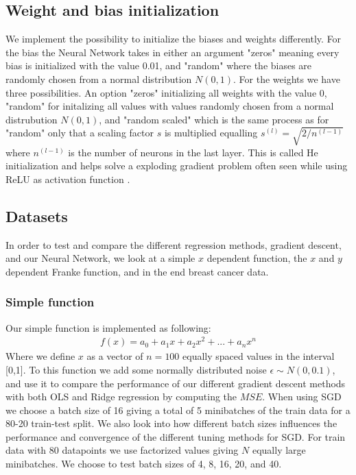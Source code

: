 \documentclass[11pt]{article}
\begin{document}
\subsection{Weight and bias initialization}
We implement the possibility to initialize the biases and weights differently. For the bias the Neural Network takes in either an argument "zeros" meaning every bias is initialized with the value 0.01, and "random" where the biases are randomly chosen from a normal distribution $N(0,1)$. For the weights we have three possibilities. An option "zeros" initializing all weights with the value 0, "random" for initalizing all values with values randomly chosen from a normal distrubution $N(0,1)$, and "random scaled" which is the same process as for "random" only that a scaling factor $s$ is multiplied equalling $s^{(l)}=\sqrt{2/n^{(l-1)}}$ where $n^{(l-1)}$ is the number of neurons in the last layer. This is called He initialization and helps solve a exploding gradient problem often seen while using ReLU as activation function \cite{he}\cite{he_2}.

\subsection{Datasets}
In order to test and compare the different regression methods, gradient descent, and our Neural Network, we look at a simple $x$ dependent function, the $x$ and $y$ dependent Franke function, and in the end breast cancer data.

\subsubsection*{Simple function}
Our simple function is implemented as following:
\begin{align*}
    f(x) = a_0 + a_1 x + a_2 x^2 + ... + a_n x^n
\end{align*}
Where we define $x$ as a vector of $n=100$ equally spaced values in the interval [0,1].
To this function we add some normally distributed noise $\epsilon\sim N(0,0.1)$, and use it to compare the performance of our different gradient descent methods  with both OLS and Ridge regression by computing the $MSE$. When using SGD we choose a batch size of 16 giving a total of 5 minibatches of the train data for a 80-20 train-test split. We also look into how different batch sizes influences the performance and convergence of the different tuning methods for SGD. For train data with 80 datapoints we use factorized values giving $N$ equally large minibatches. We choose to test batch sizes of 4, 8, 16, 20, and 40.
\end{document}
